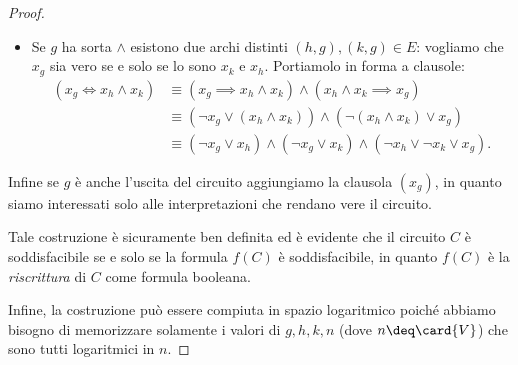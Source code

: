 \begin{proof}
\begin{itemize}
    \item Se $g$ ha sorta ${\land}$ esistono due archi distinti $(h, g), 
      (k, g) \in E$: vogliamo che $x_g$ sia vero se e solo se lo sono $x_k$ e $x_h$. 
      Portiamolo in forma a clausole: \begin{align*}
        (x_g \iff x_h \land x_k) 
          &\equiv (x_g \implies x_h \land x_k) \land (x_h \land x_k \implies x_g)\\
          &\equiv (\neg x_g \lor (x_h \land x_k)) \land (\neg (x_h \land x_k) \lor x_g)\\
          &\equiv (\neg x_g \lor x_h) \land (\neg x_g \lor x_k) \land 
                  (\neg x_h \lor \neg x_k \lor x_g).
      \end{align*} 
  \end{itemize}
  Infine se $g$ è anche l'uscita del circuito aggiungiamo la clausola $(x_g)$,
  in quanto siamo interessati solo alle interpretazioni che rendano vere il circuito.
  
  Tale costruzione è sicuramente ben definita ed è evidente che il circuito $C$
  è soddisfacibile se e solo se la formula $f(C)$ è soddisfacibile, in quanto 
  $f(C)$ è la \emph{riscrittura} di $C$ come formula booleana.
  
  Infine, la costruzione può essere compiuta in spazio logaritmico poiché abbiamo
  bisogno di memorizzare solamente i valori di $g, h, k, n$ (dove $n \deq \card{V}$) 
  che sono tutti logaritmici in $n$.  
\end{proof}
